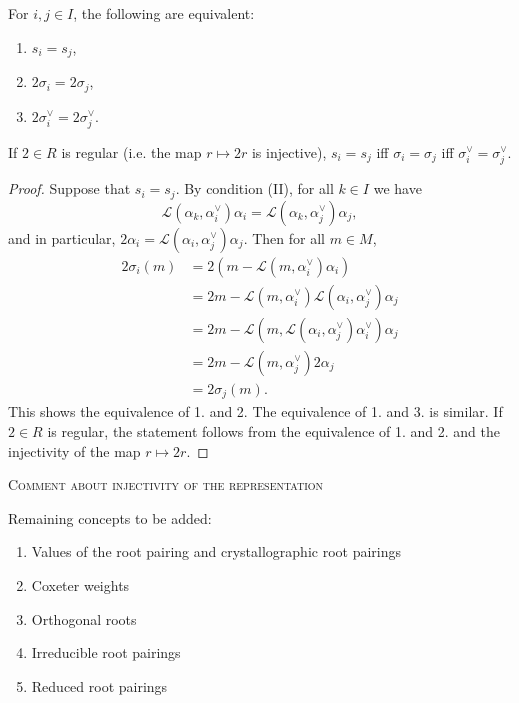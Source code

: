 \begin{lemma}
    For $i,j \in I$, the following are equivalent:
    \begin{enumerate}
        \item $s_i = s_j$,
        \item $2\sigma_i = 2\sigma_j$,
        \item $2\sigma_i^\vee = 2\sigma_j^\vee$.
    \end{enumerate}
    If $2 \in R$ is regular (i.e. the map $r \mapsto 2r$ is injective), $s_i = s_j$ iff
    $\sigma_i = \sigma_j$ iff $\sigma_i^\vee = \sigma_j^\vee$.  
\end{lemma}
\begin{proof}
Suppose that $s_i = s_j$. By condition (II), for all $k \in I$ we have
\[
    \mathcal{L}(\alpha_k,\alpha_i^\vee)\alpha_i = \mathcal{L}(\alpha_k,\alpha_j^\vee)\alpha_j,
\]
and in particular, $2\alpha_i = \mathcal{L}(\alpha_i,\alpha_j^\vee)\alpha_j$. Then for all $m \in M$,
\begin{align*}
    2\sigma_i(m) &= 2(m - \mathcal{L}(m,\alpha^\vee_i)\alpha_i) \\
                &= 2m - \mathcal{L}(m,\alpha^\vee_i)\mathcal{L}(\alpha_i,\alpha_j^\vee)\alpha_j\\
                &= 2m - \mathcal{L}(m,\mathcal{L}(\alpha_i,\alpha_j^\vee)\alpha^\vee_i)\alpha_j\\
                &= 2m - \mathcal{L}(m,\alpha^\vee_j)2\alpha_j\\
                &= 2 \sigma_j(m).
\end{align*}
This shows the equivalence of 1. and 2. The equivalence of 1. and 3. is similar. If $2 \in R$ is regular, 
the statement follows from the equivalence of 1. and 2. and the injectivity of the map $r \mapsto 2r$.
\end{proof}

\textsc{Comment about injectivity of the representation}






Remaining concepts to be added:
\begin{enumerate}
    \item Values of the root pairing and crystallographic root pairings
    \item Coxeter weights
    \item Orthogonal roots 
    \item Irreducible root pairings
    \item Reduced root pairings
\end{enumerate}